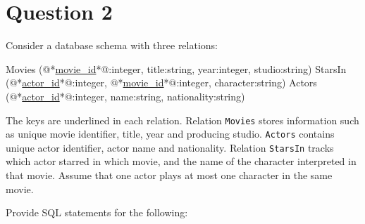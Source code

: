 
\section*{Question 2}

Consider a database schema with three relations:\\

\begin{terminal}
Movies (@*\underline{movie\_id}*@:integer, title:string, year:integer, studio:string)
StarsIn (@*\underline{actor\_id}*@:integer, @*\underline{movie\_id}*@:integer, character:string)
Actors (@*\underline{actor\_id}*@:integer, name:string, nationality:string)
\end{terminal}

The keys are underlined in each relation.
Relation \texttt{Movies} stores information such as unique movie identifier, title, year and producing studio.
\texttt{Actors} contains unique actor identifier, actor name and nationality.
Relation \texttt{StarsIn} tracks which actor starred in which movie, and the name of the character interpreted in that movie.
Assume that one actor plays at most one character in the  same movie.

Provide SQL statements for the following:

